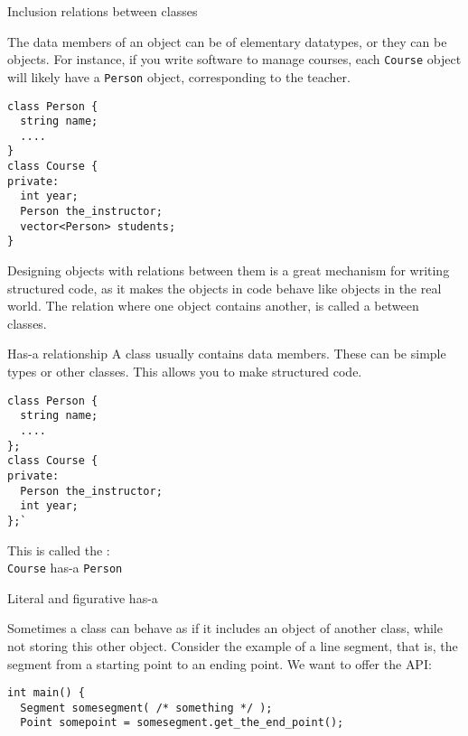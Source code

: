 
 {Inclusion relations between classes}
\label{sec:hasa}

The data members of an object can be of elementary datatypes, or they
can be objects. For instance, if you write software to manage courses,
each \lstinline{Course} object will likely have a \lstinline{Person} object,
corresponding to the teacher.

\begin{lstlisting}
class Person {
  string name;
  ....
}
class Course {
private:
  int year;
  Person the_instructor;
  vector<Person> students;
}
\end{lstlisting}

Designing objects with relations between them
is a great mechanism for writing structured code,
as it makes the objects in code behave like objects in the real world.
The relation where one object contains another, is called a
 between classes.

\begin{slide}{Has-a relationship}
  \label{sl:obj-hasa}
  A class usually contains data members. These can be simple types or
  other classes. This allows you to make structured code.
  \lstset{style=snippetcode}
\begin{lstlisting}
class Person {
  string name;
  ....
};
class Course {
private:
  Person the_instructor;
  int year;
};`
\end{lstlisting}
This is called the :\\
\lstinline{Course} has-a \lstinline{Person}
\end{slide}

 {Literal and figurative has-a}

Sometimes a class can behave as if it includes an object of another
class, while not storing this other object.
Consider the example of a line segment, that is, the segment
from a starting point to an ending point.
We want to offer the \ac{API}:
\begin{lstlisting}
int main() {
  Segment somesegment( /* something */ );
  Point somepoint = somesegment.get_the_end_point();
\end{lstlisting}

